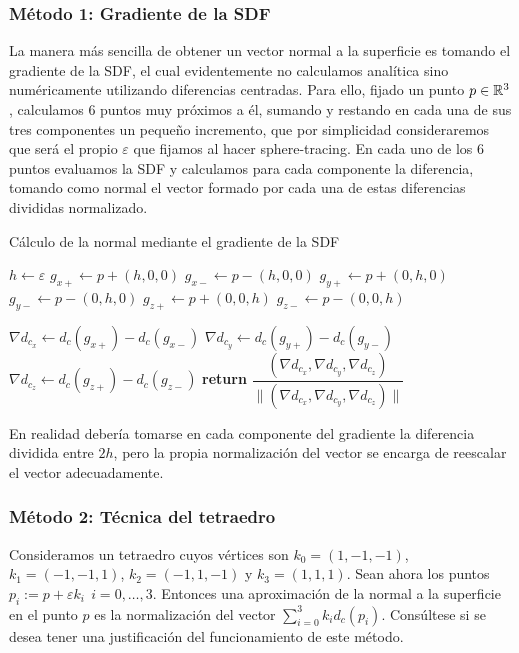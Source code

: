 \subsubsection{Método 1: Gradiente de la SDF}

La manera más sencilla de obtener un vector normal a la superficie es tomando el gradiente de la SDF, el cual evidentemente no calculamos analítica sino numéricamente utilizando diferencias centradas. Para ello, fijado un punto $p\in\mathbb{R}^3$, calculamos 6 puntos muy próximos a él, sumando y restando en cada una de sus tres componentes un pequeño incremento, que por simplicidad consideraremos que será el propio $\varepsilon$ que fijamos al hacer sphere-tracing. En cada uno de los 6 puntos evaluamos la SDF y calculamos para cada componente la diferencia, tomando como normal el vector formado por cada una de estas diferencias divididas normalizado.

\begin{algorithm}[H]
    \caption{Cálculo de la normal mediante el gradiente de la SDF} \label{alg:normal-gradiente-sdf}
    \begin{algorithmic}
        \State $h\gets\varepsilon$
        \State $g_{x+}\gets p + (h,0,0)$
        \State $g_{x-}\gets p - (h,0,0)$
        \State $g_{y+}\gets p + (0,h,0)$
        \State $g_{y-}\gets p - (0,h,0)$
        \State $g_{z+}\gets p + (0,0,h)$
        \State $g_{z-}\gets p - (0,0,h)$

        \State $\nabla d_{c_x} \gets d_c(g_{x+})-d_c(g_{x-})$
        \State $\nabla d_{c_y} \gets d_c(g_{y+})-d_c(g_{y-})$
        \State $\nabla d_{c_z} \gets d_c(g_{z+})-d_c(g_{z-})$
            \State \textbf{return} $\dfrac{(\nabla d_{c_x},\nabla d_{c_y},\nabla d_{c_z})}{\|(\nabla d_{c_x},\nabla d_{c_y},\nabla d_{c_z})\|}$
    \EndProcedure
    \end{algorithmic}
\end{algorithm}

En realidad debería tomarse en cada componente del gradiente la diferencia dividida entre $2h$, pero la propia normalización del vector se encarga de reescalar el vector adecuadamente.    

\subsubsection{Método 2: Técnica del tetraedro}

Consideramos un tetraedro cuyos vértices son $k_0=(1,-1,-1)$, $k_1=(-1,-1,1)$, $k_2=(-1,1,-1)$ y $k_3=(1,1,1)$. Sean ahora los puntos $p_i := p+\varepsilon k_i\ \ i=0,\dots,3$. Entonces una aproximación de la normal a la superficie en el punto $p$ es la normalización del vector $\sum_{i=0}^3 k_i d_c(p_i)$. Consúltese \cite{normals-sdf} si se desea tener una justificación del funcionamiento de este método.

